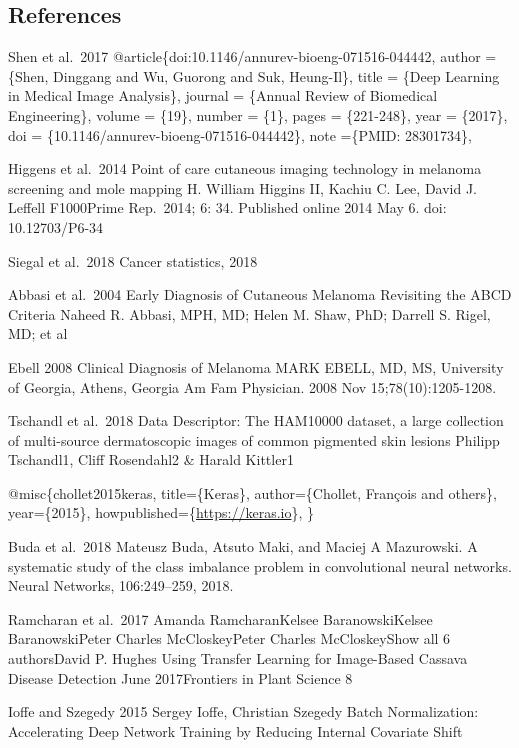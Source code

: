 \documentclass[11pt]{article}
\begin{document}
    \hypertarget{references}{%
\subsection{References}\label{references}}

Shen et al.~2017 @article\{doi:10.1146/annurev-bioeng-071516-044442,
author = \{Shen, Dinggang and Wu, Guorong and Suk, Heung-Il\}, title =
\{Deep Learning in Medical Image Analysis\}, journal = \{Annual Review
of Biomedical Engineering\}, volume = \{19\}, number = \{1\}, pages =
\{221-248\}, year = \{2017\}, doi =
\{10.1146/annurev-bioeng-071516-044442\}, note =\{PMID: 28301734\},

Higgens et al.~2014 Point of care cutaneous imaging technology in
melanoma screening and mole mapping H. William Higgins II, Kachiu C.
Lee, David J. Leffell F1000Prime Rep.~2014; 6: 34. Published online 2014
May 6. doi: 10.12703/P6-34

Siegal et al.~2018 Cancer statistics, 2018

Abbasi et al.~2004 Early Diagnosis of Cutaneous Melanoma Revisiting the
ABCD Criteria Naheed R. Abbasi, MPH, MD; Helen M. Shaw, PhD; Darrell S.
Rigel, MD; et al

Ebell 2008 Clinical Diagnosis of Melanoma MARK EBELL, MD, MS, University
of Georgia, Athens, Georgia Am Fam Physician. 2008 Nov
15;78(10):1205-1208.

Tschandl et al.~2018 Data Descriptor: The HAM10000 dataset, a large
collection of multi-source dermatoscopic images of common pigmented skin
lesions Philipp Tschandl1, Cliff Rosendahl2 \& Harald Kittler1

@misc\{chollet2015keras, title=\{Keras\}, author=\{Chollet, Fran\c{c}ois
and others\}, year=\{2015\}, howpublished=\{\url{https://keras.io}\}, \}

Buda et al.~2018 Mateusz Buda, Atsuto Maki, and Maciej A Mazurowski. A
systematic study of the class imbalance problem in convolutional neural
networks. Neural Networks, 106:249--259, 2018.

Ramcharan et al.~2017 Amanda RamcharanKelsee BaranowskiKelsee
BaranowskiPeter Charles McCloskeyPeter Charles McCloskeyShow all 6
authorsDavid P. Hughes Using Transfer Learning for Image-Based Cassava
Disease Detection June 2017Frontiers in Plant Science 8

Ioffe and Szegedy 2015 Sergey Ioffe, Christian Szegedy Batch
Normalization: Accelerating Deep Network Training by Reducing Internal
Covariate Shift


    
    
    
    
\end{document}
